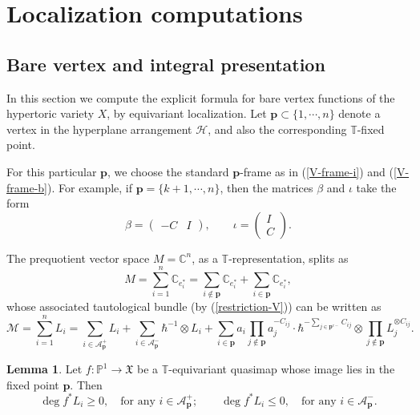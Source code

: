 \documentclass[10pt]{amsart}
\theoremstyle{definition}
\def\PP{{\mathbb{P}}}
\def\CC{{\mathbb{C}}}
\def\TT{\mathbb{T}}
\newcommand{\bp}{\mathbf{p}}
\newcommand{\cA}{\mathcal{A}}
\newcommand{\cH}{\mathcal{H}}
\newcommand{\cM}{\mathcal{M}}
\newcommand{\fX}{\mathfrak{X}}
\theoremstyle{definition}
\numberwithin{equation}{section}
\theoremstyle{Theorem}
\newtheorem{Lemma}[Definition]{Lemma}
\begin{document}



\vspace{3ex}


\section{Localization computations}

\subsection{Bare vertex and integral presentation}

In this section we compute the explicit formula for bare vertex functions of the hypertoric variety $X$, by equivariant localization. Let $\bp \subset \{1, \cdots, n\}$ denote a vertex in the hyperplane arrangement $\cH$, and also the corresponding $\TT$-fixed point.

For this particular $\bp$, we choose the standard $\bp$-frame as in (\ref{V-frame-i}) and (\ref{V-frame-b}). For example, if $\bp = \{ k+1, \cdots, n \}$, then the matrices $\beta$ and $\iota$ take the form
$$
\beta = \begin{pmatrix}
-C & I
\end{pmatrix}, \qquad \iota = \begin{pmatrix}
I \\
C
\end{pmatrix}.
$$

The prequotient vector space $M = \CC^n$, as a $\TT$-representation, splits as
$$
M = \sum_{i=1}^n \CC_{e_i^*} = \sum_{i\not\in \bp} \CC_{e_i^*} + \sum_{i\in \bp} \CC_{e^*_i},
$$
whose associated tautological bundle (by (\ref{restriction-V})) can be written as
$$
\cM = \sum_{i=1}^n L_i = \sum_{i\in \cA_\bp^+ } L_i + \sum_{i\in \cA_\bp^-} \hbar^{-1} \otimes L_i + \sum_{i\in \bp} a_i \prod_{j\not\in \bp} a_j^{-C_{ij}} \cdot  \hbar^{- \sum_{j \in \bp^{c-} } C_{ij} } \otimes  \prod_{j\not\in \bp} L_j^{\otimes C_{ij}}.
$$

\begin{Lemma}
Let $f: \PP^1 \to \fX$ be a $\TT$-equivariant quasimap whose image lies in the fixed point $\bp$. Then
$$
\deg f^* L_i \geq 0, \quad \text{for any } i\in \cA_\bp^+; \qquad \deg f^* L_i \leq 0, \quad \text{for any } i\in \cA_\bp^-.
$$
\end{Lemma}
\end{document}
